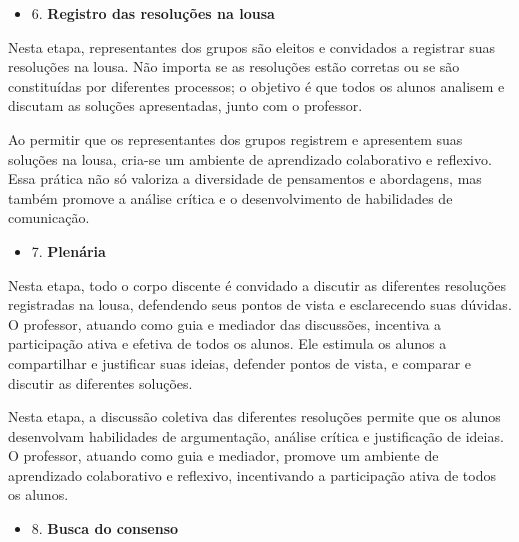 \begin{itemize}
    \item 6. \textbf{Registro das resoluções na lousa}
\end{itemize}

Nesta etapa, representantes dos grupos são eleitos e convidados a registrar suas resoluções na lousa. Não importa se as resoluções estão corretas ou se são constituídas por diferentes processos; o objetivo é que todos os alunos analisem e discutam as soluções apresentadas, junto com o professor.

Ao permitir que os representantes dos grupos registrem e apresentem suas soluções na lousa, cria-se um ambiente de aprendizado colaborativo e reflexivo. Essa prática não só valoriza a diversidade de pensamentos e abordagens, mas também promove a análise crítica e o desenvolvimento de habilidades de comunicação.


\begin{itemize}
    \item 7. \textbf{Plenária}
\end{itemize}

Nesta etapa, todo o corpo discente é convidado a discutir as diferentes resoluções registradas na lousa, defendendo seus pontos de vista e esclarecendo suas dúvidas. O professor, atuando como guia e mediador das discussões, incentiva a participação ativa e efetiva de todos os alunos. Ele estimula os alunos a compartilhar e justificar suas ideias, defender pontos de vista, e comparar e discutir as diferentes soluções.

Nesta etapa, a discussão coletiva das diferentes resoluções permite que os alunos desenvolvam habilidades de argumentação, análise crítica e justificação de ideias. O professor, atuando como guia e mediador, promove um ambiente de aprendizado colaborativo e reflexivo, incentivando a participação ativa de todos os alunos.


\begin{itemize}
    \item 8. \textbf{Busca do consenso}
\end{itemize}

